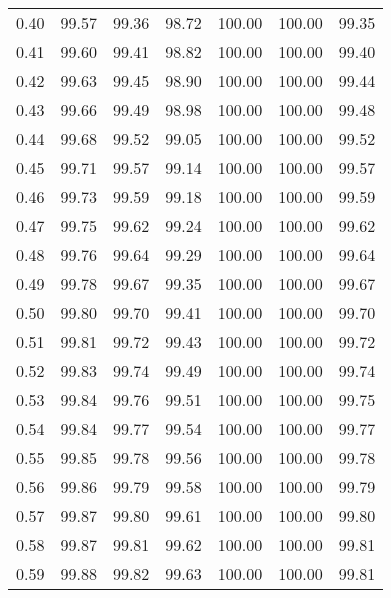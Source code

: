 \begin{tabular}{|c|c|c|c|c|c|c|}
      0.40 &     99.57 &     99.36 &      98.72 &  100.00 &     100.00 &         99.35 \\
      0.41 &     99.60 &     99.41 &      98.82 &  100.00 &     100.00 &         99.40 \\
      0.42 &     99.63 &     99.45 &      98.90 &  100.00 &     100.00 &         99.44 \\
      0.43 &     99.66 &     99.49 &      98.98 &  100.00 &     100.00 &         99.48 \\
      0.44 &     99.68 &     99.52 &      99.05 &  100.00 &     100.00 &         99.52 \\
      0.45 &     99.71 &     99.57 &      99.14 &  100.00 &     100.00 &         99.57 \\
      0.46 &     99.73 &     99.59 &      99.18 &  100.00 &     100.00 &         99.59 \\
      0.47 &     99.75 &     99.62 &      99.24 &  100.00 &     100.00 &         99.62 \\
      0.48 &     99.76 &     99.64 &      99.29 &  100.00 &     100.00 &         99.64 \\
      0.49 &     99.78 &     99.67 &      99.35 &  100.00 &     100.00 &         99.67 \\
      0.50 &     99.80 &     99.70 &      99.41 &  100.00 &     100.00 &         99.70 \\
      0.51 &     99.81 &     99.72 &      99.43 &  100.00 &     100.00 &         99.72 \\
      0.52 &     99.83 &     99.74 &      99.49 &  100.00 &     100.00 &         99.74 \\
      0.53 &     99.84 &     99.76 &      99.51 &  100.00 &     100.00 &         99.75 \\
      0.54 &     99.84 &     99.77 &      99.54 &  100.00 &     100.00 &         99.77 \\
      0.55 &     99.85 &     99.78 &      99.56 &  100.00 &     100.00 &         99.78 \\
      0.56 &     99.86 &     99.79 &      99.58 &  100.00 &     100.00 &         99.79 \\
      0.57 &     99.87 &     99.80 &      99.61 &  100.00 &     100.00 &         99.80 \\
      0.58 &     99.87 &     99.81 &      99.62 &  100.00 &     100.00 &         99.81 \\
      0.59 &     99.88 &     99.82 &      99.63 &  100.00 &     100.00 &         99.81 \\

\end{tabular}
